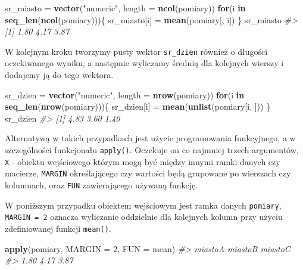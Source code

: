 \documentclass[paper=6in:9in,pagesize=pdftex,headinclude=on,footinclude=on,10pt]{scrbook}
\newenvironment{Shaded}{\begin{snugshade}}{\end{snugshade}}
\newcommand{\CommentTok}[1]{\textcolor[rgb]{0.56,0.35,0.01}{\textit{#1}}}
\newcommand{\ControlFlowTok}[1]{\textcolor[rgb]{0.13,0.29,0.53}{\textbf{#1}}}
\newcommand{\DataTypeTok}[1]{\textcolor[rgb]{0.13,0.29,0.53}{#1}}
\newcommand{\DecValTok}[1]{\textcolor[rgb]{0.00,0.00,0.81}{#1}}
\newcommand{\KeywordTok}[1]{\textcolor[rgb]{0.13,0.29,0.53}{\textbf{#1}}}
\newcommand{\NormalTok}[1]{#1}
\newcommand{\StringTok}[1]{\textcolor[rgb]{0.31,0.60,0.02}{#1}}
\begin{document}
\begin{Shaded}
\begin{Highlighting}[]
\NormalTok{sr_miasto =}\StringTok{ }\KeywordTok{vector}\NormalTok{(}\StringTok{"numeric"}\NormalTok{, }\DataTypeTok{length =} \KeywordTok{ncol}\NormalTok{(pomiary))}
\ControlFlowTok{for}\NormalTok{(i }\ControlFlowTok{in} \KeywordTok{seq_len}\NormalTok{(}\KeywordTok{ncol}\NormalTok{(pomiary)))\{}
\NormalTok{  sr_miasto[i] =}\StringTok{ }\KeywordTok{mean}\NormalTok{(pomiary[, i])}
\NormalTok{\}}
\NormalTok{sr_miasto}
\CommentTok{#> [1] 1.80 4.17 3.87}
\end{Highlighting}
\end{Shaded}

W kolejnym kroku tworzymy pusty wektor \texttt{sr\_dzien} również o długości oczekiwanego wyniku, a następnie wyliczamy średnią dla kolejnych wierszy i dodajemy ją do tego wektora.

\begin{Shaded}
\begin{Highlighting}[]
\NormalTok{sr_dzien =}\StringTok{ }\KeywordTok{vector}\NormalTok{(}\StringTok{"numeric"}\NormalTok{, }\DataTypeTok{length =} \KeywordTok{nrow}\NormalTok{(pomiary))}
\ControlFlowTok{for}\NormalTok{(i }\ControlFlowTok{in} \KeywordTok{seq_len}\NormalTok{(}\KeywordTok{nrow}\NormalTok{(pomiary)))\{}
\NormalTok{  sr_dzien[i] =}\StringTok{ }\KeywordTok{mean}\NormalTok{(}\KeywordTok{unlist}\NormalTok{(pomiary[i, ]))}
\NormalTok{\}}
\NormalTok{sr_dzien}
\CommentTok{#> [1] 4.83 3.60 1.40}
\end{Highlighting}
\end{Shaded}

Alternatywą w takich przypadkach jest użycie programowania funkcyjnego, a w szczególności funkcjonału \texttt{apply()}.
Oczekuje on co najmniej trzech argumentów, \texttt{X} - obiektu wejściowego którym mogą być między innymi ramki danych czy macierze, \texttt{MARGIN} określającego czy wartości będą grupowane po wierszach czy kolumnach, oraz \texttt{FUN} zawierającego używaną funkcję.

W poniższym przypadku obiektem wejściowym jest ramka danych \texttt{pomiary}, \texttt{MARGIN\ =\ 2} oznacza wyliczanie oddzielnie dla kolejnych kolumn przy użyciu zdefiniowanej funkcji \texttt{mean()}.

\begin{Shaded}
\begin{Highlighting}[]
\KeywordTok{apply}\NormalTok{(pomiary, }\DataTypeTok{MARGIN =} \DecValTok{2}\NormalTok{, }\DataTypeTok{FUN =}\NormalTok{ mean)}
\CommentTok{#> miastoA miastoB miastoC }
\CommentTok{#>    1.80    4.17    3.87}
\end{Highlighting}
\end{Shaded}
\end{document}
